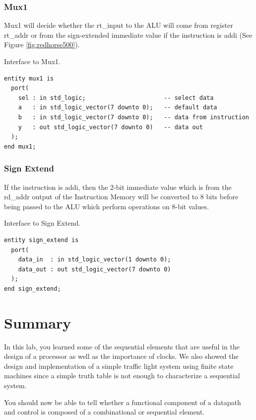 \documentclass[a4paper, 11pt,oneside]{article}
\begin{document}
\subsubsection{Mux1}
Mux1 will decide whether the rt\_input to the ALU will come from register 
rt\_addr or from the sign-extended immediate value if the instruction is addi 
(See Figure \ref{fig:redhorse500}).

\begin{listing}[H]
\caption{Interface to Mux1.}
\label{code:mux1}
\begin{verbatim}
entity mux1 is
  port(
    sel : in std_logic;                      -- select data
    a   : in std_logic_vector(7 downto 0);   -- default data
    b   : in std_logic_vector(7 downto 0);   -- data from instruction
    y   : out std_logic_vector(7 downto 0)   -- data out
  );
end mux1;
\end{verbatim}
\end{listing}


\subsubsection{Sign Extend}
If the instruction is addi, then the 2-bit immediate value which is from the 
rd\_addr output of the Instruction Memory will be converted to 8 bits before 
being passed to the ALU which perform operations on 8-bit values.
\begin{listing}[H]
\caption{Interface to Sign Extend.}
\label{code:sign_extend}
\begin{verbatim}
entity sign_extend is
  port(
    data_in  : in std_logic_vector(1 downto 0);
    data_out : out std_logic_vector(7 downto 0)
  );
end sign_extend;
\end{verbatim}
\end{listing}

\section{Summary}
In this lab, you learned some of the sequential elements that are useful in the 
design of a processor as well as the importance of clocks. We also showed the
design and implementation of a simple traffic light system using finite state 
machines since a simple truth table is not enough to characterize a sequential 
system. 

You should now be able to tell whether a functional component of a datapath and 
control is composed of a combinational or sequential element.
\end{document}
